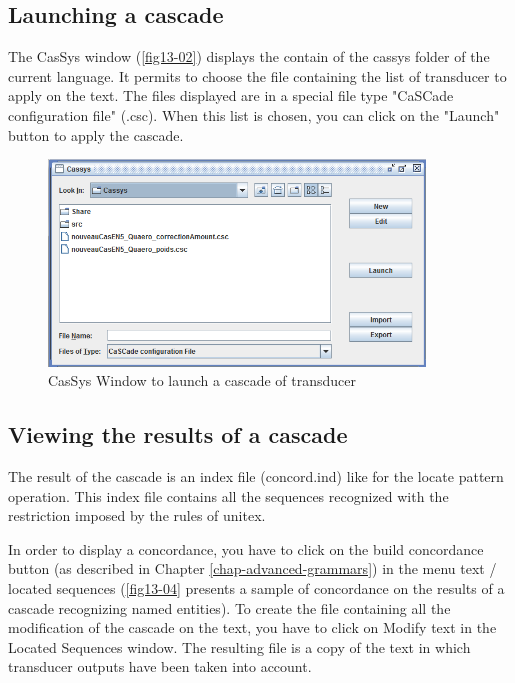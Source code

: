 \subsection{Launching a cascade}
\label{subsec:launchCascade}

The CasSys window (\ref{fig13-02}) displays the contain of the cassys folder of the current language. It permits to choose 
the file containing the list of transducer to apply on the text. The files displayed are in a special file type "CaSCade configuration file" (.csc). 
When this list is chosen, you can click on the "Launch" button to apply the cascade.

\begin{figure}[!htb]
  \centering
  \includegraphics[width=10cm]{resources/img/fig13-02.png}
  \caption{CasSys Window to launch a cascade of transducer}
  \label{fig:fig13-02}
\end{figure}

\subsection{Viewing the results of a cascade}
\label{subsec:resultsCascade}

The result of the cascade is an index file (concord.ind) like for the locate pattern operation. This index file contains all the sequences recognized with the restriction imposed by the rules of unitex.

\bigskip
\noindent In order to display a concordance, you have to click on the build concordance button (as described in Chapter \ref{chap-advanced-grammars}) 
in the menu text / located sequences (\ref{fig13-04} presents a sample of concordance on the results of a cascade recognizing named entities).
To create the file containing all the modification of the cascade on the text, you have to click on Modify text in the Located Sequences window.
 The resulting file is a copy of the text in which transducer outputs have been taken into account.

